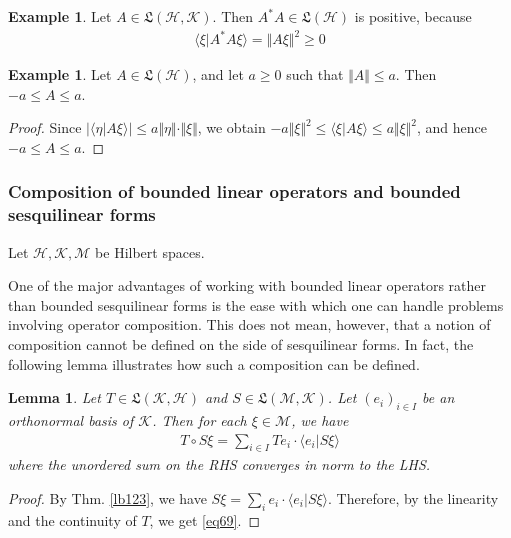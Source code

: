 \documentclass[12pt,b5paper,notitlepage]{article}
\theoremstyle{definition}
\newtheorem{eg}[df]{Example}
\theoremstyle{plain}
\newtheorem{lm}[df]{Lemma}
\newcommand{\fk}{\mathfrak}
\newcommand{\bk}[1]{\langle {#1}\rangle}
\newcommand{\MH}{\mathcal H}
\newcommand{\MK}{\mathcal K}
\newcommand{\MM}{\mathcal M}
\numberwithin{equation}{section}
\begin{document}
\begin{eg}
Let $A\in\fk L(\MH,\MK)$. Then $A^*A\in\fk L(\MH)$ is positive, because
\begin{align*}
\bk{\xi|A^*A\xi}=\Vert A\xi\Vert^2\geq0
\end{align*}
\end{eg}

\begin{eg}\label{lb201}
Let $A\in\fk L(\MH)$, and let $a\geq0$ such that $\Vert A\Vert\leq a$. Then $-a\leq A\leq a$.
\end{eg}

\begin{proof}
Since $|\bk{\eta|A\xi}|\leq a\Vert\eta\Vert\cdot\Vert\xi\Vert$, we obtain $-a\Vert\xi\Vert^2\leq\bk{\xi|A\xi}\leq a\Vert\xi\Vert^2$, and hence $-a\leq A\leq a$. 
\end{proof}


\subsubsection{Composition of bounded linear operators and bounded sesquilinear forms}\label{lb152}


Let $\MH,\MK,\MM$ be Hilbert spaces.

One of the major advantages of working with bounded linear operators rather than bounded sesquilinear forms is the ease with which one can handle problems involving operator composition. This does not mean, however, that a notion of composition cannot be defined on the side of sesquilinear forms. In fact, the following lemma illustrates how such a composition can be defined.

\begin{lm}\label{lb138}
Let $T\in\fk L(\MK,\MH)$ and $S\in\fk L(\MM,\MK)$. Let $(e_i)_{i\in I}$ be an orthonormal basis of $\MK$. Then for each $\xi\in\MM$, we have
\begin{align}\label{eq69}
T\circ S\xi=\sum_{i\in I}Te_i\cdot\bk{e_i|S\xi}
\end{align}
where the unordered sum on the RHS converges in norm to the LHS.
\end{lm}

\begin{proof}
By Thm. \ref{lb123}, we have $S\xi=\sum_i e_i\cdot\bk{e_i|S\xi}$. Therefore, by the linearity and the continuity of $T$, we get \eqref{eq69}.
\end{proof}
\end{document}
